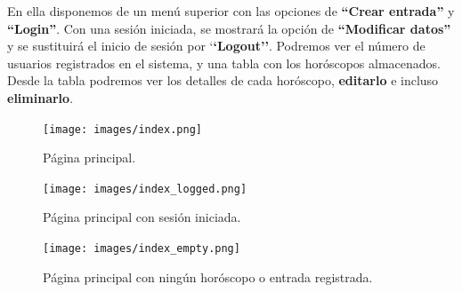 \documentclass[12pt, twoside]{report}
\begin{document}
En ella disponemos de un menú superior con las opciones de \textbf{``Crear entrada''} y \textbf{``Login''}. Con una sesión iniciada, se mostrará la opción de \textbf{``Modificar datos''} y se sustituirá el inicio de sesión por `\textbf{`Logout''}. Podremos ver el número de usuarios registrados en el sistema, y una tabla con los horóscopos almacenados. Desde la tabla podremos ver los detalles de cada horóscopo, \textbf{editarlo} e incluso \textbf{eliminarlo}.\\
\begin{figure}[h]
\begin{center}
\texttt{[image: images/index.png]}
\end{center}
\caption{\label{inicio} Página principal.}
\end{figure}
\begin{figure}[h]
\begin{center}
\texttt{[image: images/index\_logged.png]}
\end{center}
\caption{\label{inicio} Página principal con sesión iniciada.}
\end{figure}
\begin{figure}[h]
\begin{center}
\texttt{[image: images/index\_empty.png]}
\end{center}
\caption{\label{inicio} Página principal con ningún horóscopo o entrada registrada.}
\end{figure}
\clearpage
\end{document}
